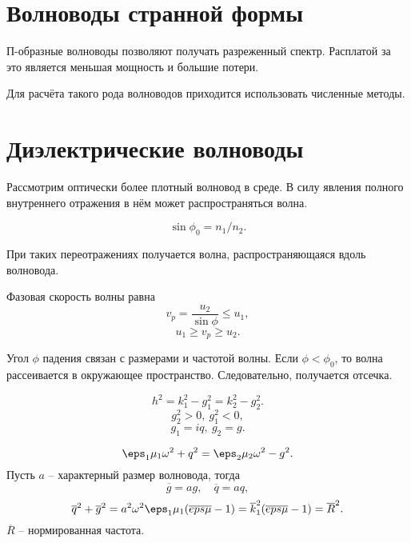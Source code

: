 \section{Волноводы странной формы}

П-образные волноводы позволяют получать разреженный спектр. Расплатой за это является меньшая мощность и большие потери.

Для расчёта такого рода волноводов приходится использовать численные методы.


\section{Диэлектрические волноводы}

Рассмотрим оптически более плотный волновод в среде. В силу явления полного внутреннего отражения в нём может распространяться волна.

\[
	\sin\phi_0 = n_1 / n_2.
\]

При таких переотражениях получается волна, распространяющаяся вдоль волновода.

Фазовая скорость волны равна
\[
	v_p = \frac{u_2}{\sin\phi} \le u_1,
\]
\[
	u_1 \ge v_p \ge u_2.
\]

Угол \( \phi \) падения связан с размерами и частотой волны. Если \( \phi < \phi_0 \), то волна рассеивается в окружающее пространство. Следовательно, получается отсечка.

\[
	h^2 = k_1^2 - g_1^2 = k_2^2 - g_2^2.
\]
\[
	g_2^2 > 0,\ g_1^2 < 0,
\]
\[
	g_1 = iq,\ g_2 = g.
\]

\[
	\eps_1\mu_1\omega^2 + q^2 = \eps_2\mu_2\omega^2 - g^2.
\]
Пусть \( a \) -- характерный размер волновода, тогда
\[
	\overline{g} = ag,\quad \overline{q} = aq,
\]
\[
	\overline{q}^2 + \overline{g}^2 = a^2\omega^2\eps_1\mu_1(\overline{eps}\overline{\mu} - 1) = \overline{k}_1^2(\overline{eps}\overline{\mu} - 1) = \overline{R}^2.
\]
\(\overline{R}\) -- нормированная частота.